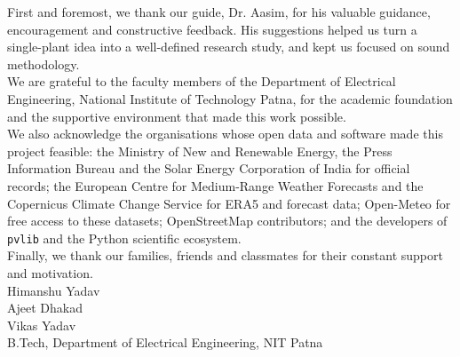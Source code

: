 \documentclass[12pt]{report}
\begin{document}
First and foremost, we thank our guide, Dr. Aasim, for his valuable guidance, encouragement and constructive feedback. His suggestions helped us turn a single-plant idea into a well-defined research study, and kept us focused on sound methodology.\\

We are grateful to the faculty members of the Department of Electrical Engineering, National Institute of Technology Patna, for the academic foundation and the supportive environment that made this work possible.\\

We also acknowledge the organisations whose open data and software made this project feasible: the Ministry of New and Renewable Energy, the Press Information Bureau and the Solar Energy Corporation of India for official records; the European Centre for Medium-Range Weather Forecasts and the Copernicus Climate Change Service for ERA5 and forecast data; Open-Meteo for free access to these datasets; OpenStreetMap contributors; and the developers of \texttt{pvlib} and the Python scientific ecosystem.\\

Finally, we thank our families, friends and classmates for their constant support and motivation.\\

Himanshu Yadav\\
Ajeet Dhakad\\
Vikas Yadav\\
B.Tech, Department of Electrical Engineering, NIT Patna
\clearpage

\end{document}
